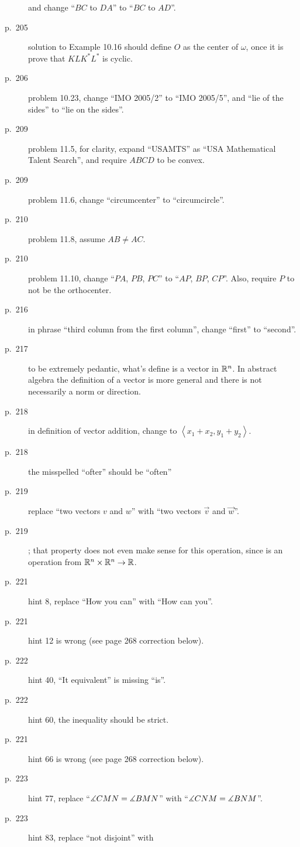 \documentclass[11pt]{scrartcl}
\begin{document}
\begin{description}
  and change ``$BC$ to $DA$'' to ``$BC$ to $AD$''.
\item[p.\  205] solution to Example 10.16 should define $O$ as the center of $\omega$,
  once it is prove that $KL K^\ast L^\ast$ is cyclic.
\item[p.\  206] problem 10.23, change ``IMO 2005/2'' to ``IMO 2005/5'',
  and ``lie of the sides'' to ``lie on the sides''.
\item[p.\  209] problem 11.5, for clarity,
  expand ``USAMTS'' as ``USA Mathematical Talent Search'',
  and require $ABCD$ to be convex.
\item[p.\  209] problem 11.6, change ``circumcenter'' to ``circumcircle''.
\item[p.\  210] problem 11.8, assume $AB \neq AC$.
\item[p.\  210] problem 11.10, change ``$PA$, $PB$, $PC$'' to ``$AP$, $BP$, $CP$''.
  Also, require $P$ to not be the orthocenter.
\item[p.\  216] in phrase ``third column from the first column'',
  change ``first'' to ``second''.
\item[p.\  217] to be extremely pedantic, what's define is a vector in $\mathbb R^n$.
  In abstract algebra the definition of a vector is more general
  and there is not necessarily a norm or direction.
\item[p.\  218] in definition of vector addition,
  change to $\left\langle x_1+x_2, y_1+y_2 \right\rangle$.
\item[p.\  218] the misspelled ``ofter'' should be ``often''
\item[p.\  219] replace ``two vectors $v$ and $w$'' with ``two vectors $\vec v$ and $\vec w$''.
\item[p.\  219] ;
  that property does not even make sense for this operation,
  since is an operation from $\mathbb R^n \times \mathbb R^n \to \mathbb R$.
\item[p.\  221] hint 8, replace ``How you can'' with ``How can you''.
\item[p.\  221] hint 12 is wrong (see page 268 correction below).
\item[p.\  222] hint 40, ``It equivalent'' is missing ``is''.
\item[p.\  222] hint 60, the inequality should be strict.
\item[p.\  221] hint 66 is wrong (see page 268 correction below).
\item[p.\  223] hint 77, replace ``$\measuredangle CMN = \measuredangle BMN$''
  with ``$\measuredangle CNM = \measuredangle BNM$''.
\item[p.\  223] hint 83, replace ``not disjoint'' with

\end{description}
\end{document}

